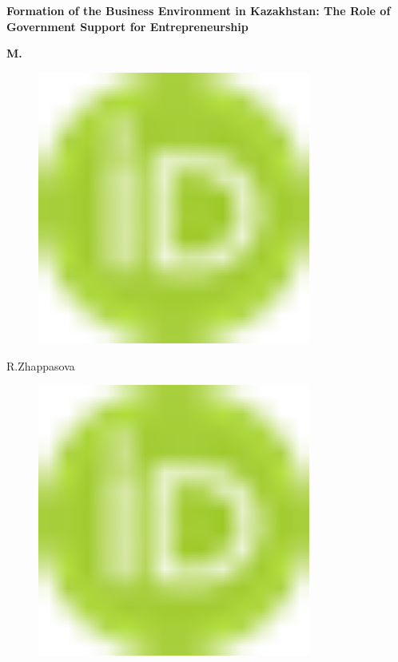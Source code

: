 
{\bfseries Formation of the Business Environment in Kazakhstan: The Role of
Government Support for Entrepreneurship}

{\bfseries M.
\begin{figure}[H]
	\centering
	\includegraphics[width=0.8\textwidth]{media/ekon2/image1}
	\caption*{}
\end{figure}

R.Zhappasova}
\begin{figure}[H]
	\centering
	\includegraphics[width=0.8\textwidth]{media/ekon2/image1}
	\caption*{}
\end{figure}


